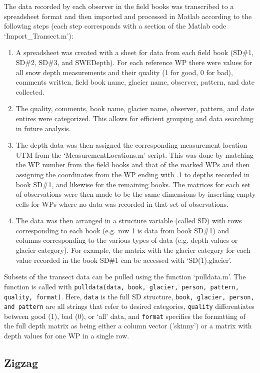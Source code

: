 \documentclass[12pt]{article}
\begin{document}
The data recorded by each observer in the field books was transcribed to a spreadsheet format and then imported and processed in Matlab according to the following steps (each step corresponds with a section of the Matlab code `Import\_Transect.m'):
\begin{enumerate}
\item A spreadsheet was created with a sheet for data from each field book (SD\#1, SD\#2, SD\#3, and SWEDepth). For each reference WP there were values for all snow depth measurements and their quality (1 for good, 0 for bad), comments written, field book name, glacier name, observer, pattern, and date collected.  
\item The quality, comments, book name, glacier name, observer, pattern, and date entires were categorized. This allows for efficient grouping and data searching in future analysis.
\item The depth data was then assigned the corresponding measurement location UTM from the `MeasurementLocations.m' script. This was done by matching the WP number from the field books and that of the marked WPs and then assigning the coordinates from the WP ending with .1 to depths recorded in book SD\#1, and likewise for the remaining books. The matrices for each set of observations were then made to be the same dimensions by inserting empty cells for WPs where no data was recorded in that set of observations. 
\item The data was then arranged in a structure variable (called SD) with rows corresponding to each book (e.g. row 1 is data from book SD\#1) and columns corresponding to the various types of data (e.g. depth values or glacier category). For example, the matrix with the glacier category for each value recorded in the book SD\#1 can be accessed with `SD(1).glacier'.
\end{enumerate}

Subsets of the transect data can be pulled using the function `pulldata.m'. The function is called with \texttt{pulldata(data, book, glacier, person, pattern, quality, format)}. Here, \texttt{data} is the full SD structure, \texttt{book, glacier, person, and pattern} are all strings that refer to desired categories, \texttt{quality} differentiates between good (1), bad (0), or `all' data, and \texttt{format} specifies the formatting of the full depth matrix as being either a column vector ('skinny') or a matrix with depth values for one WP in a single row. 


\subsection{Zigzag}
\end{document}
